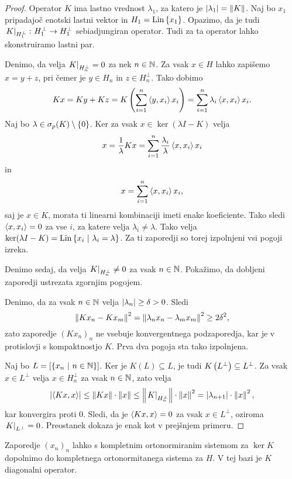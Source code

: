 \begin{proof}
Operator $K$ ima lastno vrednost $\lambda_1$, za katero je
$\left\lvert \lambda_1\right\rvert = \left\lVert K\right\rVert$. Naj bo $x_1$ pripadajoč enotski
lastni vektor in $H_1 = \operatorname{Lin} \left\{x_1\right\}$. Opazimo, da je tudi
$\left. K\right|_{H_1^\bot}^{} \colon H_1^\bot \to H_1^\bot$ sebiadjungiran
operator. Tudi za ta operator lahko skonstruiramo lastni par.

Denimo, da velja $\left. K\right|_{H_n^\bot}^{} = 0$ za nek $n \in \mathbb{N}$. Za
vsak $x \in H$ lahko zapišemo $x = y + z$, pri čemer je $y \in H_n$
in $z \in H_n^\bot$. Tako dobimo
\[
K x =
K y + K z =
K \left(\sum_{i=1}^n \left\langle y, x_i\right\rangle x_i\right) =
\sum_{i=1}^n \lambda_i \left\langle x, x_i\right\rangle x_i.
\]
Naj bo $\lambda \in \sigma_p(K) \setminus \left\{0\right\}$. Ker za vsak
$x \in \ker (\lambda I - K)$ velja
\[
x =
\frac{1}{\lambda} Kx =
\sum_{i=1}^n \frac{\lambda_i}{\lambda} \left\langle x, x_i\right\rangle x_i
\]
in
\[
x = \sum_{i=1}^n \left\langle x, x_i\right\rangle x_i,
\]
saj je $x \in K$, morata ti linearni kombinaciji imeti enake
koeficiente. Tako sledi $\left\langle x, x_i\right\rangle = 0$ za vse $i$, za katere
velja $\lambda_i \ne \lambda$. Tako velja
$\ker (\lambda I - K) = \operatorname{Lin} \left\{x_i~\middle\vert~\lambda_i = \lambda\right\}$. Za
ti zaporedji so torej izpolnjeni vsi pogoji izreka.

Denimo sedaj, da velja $\left. K\right|_{H_n^\bot}^{} \ne 0$ za vsak
$n \in \mathbb{N}$. Pokažimo, da dobljeni zaporedji ustrezata zgornjim
pogojem.

Denimo, da za vsak $n \in \mathbb{N}$ velja
$\left\lvert \lambda_n\right\rvert \geq \delta > 0$. Sledi
\[
\left\lVert K x_n - K x_m\right\rVert^2 =
\left\lVert \lambda_n x_n - \lambda_m x_m\right\rVert^2 \geq
2 \delta^2,
\]
zato zaporedje $(K x_n)_n$ ne vsebuje konvergentnega podzaporedja,
kar je v protislovji s kompaktnostjo $K$. Prva dva pogoja sta tako
izpolnjena.

Naj bo $L = [\left\{x_n~\middle\vert~n \in \mathbb{N}\right\}]$. Ker je $K(L) \subseteq L$, je
tudi $K \left(L^\bot\right) \subseteq L^\bot$. Za vsak $x \in L^\bot$ velja
$x \in H_n^\bot$ za vsak $n \in \mathbb{N}$, zato velja
\[
\left\lvert \left\langle Kx, x\right\rangle\right\rvert \leq
\left\lVert Kx\right\rVert \cdot \left\lVert x\right\rVert \leq
\left\lVert \left. K\right|_{H_n^\bot}^{}\right\rVert \cdot \left\lVert x\right\rVert^2 =
\left\lvert \lambda_{n+1}\right\rvert \cdot \left\lVert x\right\rVert^2,
\]
kar konvergira proti $0$. Sledi, da je $\left\langle Kx, x\right\rangle = 0$ za vsak
$x \in L^\bot$, oziroma $\left. K\right|_{L^\bot}^{} = 0$. Preostanek dokaza
je enak kot v prejšnjem primeru.
\end{proof}

\begin{opomba}
Zaporedje $(x_n)_n$ lahko s kompletnim ortonormiranim sistemom za
$\ker K$ dopolnimo do kompletnega ortonormitanega sistema za $H$.
V tej bazi je $K$ diagonalni operator.
\end{opomba}

